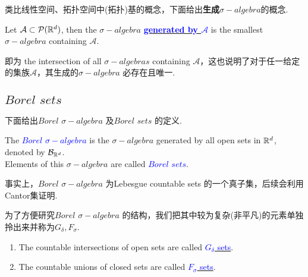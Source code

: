 	\vspace{2em}
	类比线性空间、拓扑空间中(拓扑)基的概念，下面给出\textbf{生成$\sigma-algebra$}的概念.
	\begin{defn}
		Let $\mathcal{A} \subset \mathcal{P}(\mathbb{R}^d)$, then the $\sigma-algebra$ \underline{\textcolor{blue}{\textbf{generated by $\mathcal{A}$}}} is the smallest $\sigma-algebra$ containing $\mathcal{A}$.
		
		\begin{rmk}
			即为 the intersection of all $\sigma-algebras$ containing $\mathcal{A}$，这也说明了对于任一给定的集族$\mathcal{A}$，其生成的$\sigma-algebra$ 必存在且唯一.
		\end{rmk}
	\end{defn}

\newpage
\subsection{$Borel \,\, sets$}
	下面给出$Borel \,\, \sigma-algebra$ 及$Borel \,\, sets$ 的定义.
	\begin{defn}\label{def 1.4.4}
		The \underline{\textcolor{blue}{\textbf{$Borel \,\, \sigma-algebra$}}} is the $\sigma-algebra$ generated by all open sets in $\mathbb{R}^d$, \\
		denoted by \textcolor{blue}{$\mathcal{B}_{\mathbb{R}^d}$}.\\
		Elements of this $\sigma-algebra$ are called \underline{\textcolor{blue}{$Borel \,\, sets$}}.
		
		\begin{rmk}
			事实上，$Borel \,\, \sigma-algebra$ 为Lebesgue countable sets 的一个真子集，后续会利用Cantor集证明.
		\end{rmk}
	\end{defn}

	\vspace{2em}
	为了方便研究$Borel \,\, \sigma-algebra$ 的结构，我们把其中较为复杂(非平凡)的元素单独拎出来并称为$G_\delta , F_\sigma$.
	\begin{defn}\label{def 1.4.5}
		\begin{enumerate}
			\item The countable intersections of open sets are called \underline{\textcolor{blue}{$G_\delta$ sets}}.
			
			\item The countable unions of closed sets are called \underline{\textcolor{blue}{$F_\sigma$ sets}}.
		\end{enumerate}
	\end{defn}
	
